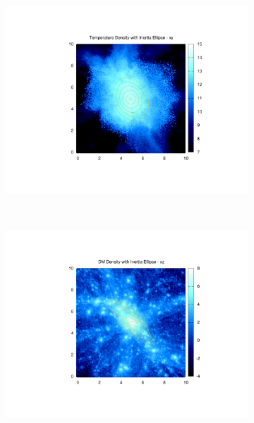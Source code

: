 \documentclass[journal]{IEEEtran}
\begin{document}
\begin{figure}[!t]
\begin{subfigure}[t]{0.3\textwidth}
		\includegraphics[width=\linewidth]{TempDenEllipxy.pdf}
	\end{subfigure}
	\\
	\begin{subfigure}[t]{0.3\textwidth}
		\centering
		\includegraphics[width=\linewidth]{DMDenEllipxz.pdf}
	\end{subfigure}
	\quad
	\begin{subfigure}[t]{0.3\textwidth}
		\centering

\end{subfigure}
\end{figure}
\end{document}
